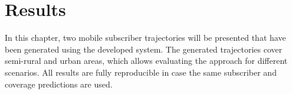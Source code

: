 \documentclass[master,english]{hgbthesis}
\begin{document}
\chapter{Results}
\label{cha:results}
In this chapter, two mobile subscriber trajectories will be presented that have been generated using the developed system. The generated trajectories cover semi-rural and urban areas, which allows evaluating the approach for different scenarios. All results are fully reproducible in case the same subscriber and coverage predictions are used.
\end{document}
